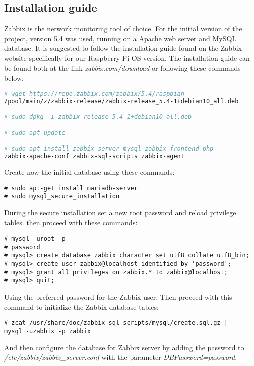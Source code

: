 \documentclass[a4paper,11pt]{scrartcl}
\begin{document}
\subsection{Installation guide}
Zabbix is the network monitoring tool of choice. For the initial version of the project, version 5.4 was used, running on a Apache web server and MySQL database. It is suggested to follow the installation guide found on the Zabbix website specifically for our Raspberry Pi OS version. The installation guide can be found both at the link \textit{zabbix.com/download} or following these commands below:\\
\begin{lstlisting}[language = bash]
# wget https://repo.zabbix.com/zabbix/5.4/raspbian
/pool/main/z/zabbix-release/zabbix-release_5.4-1+debian10_all.deb

# sudo dpkg -i zabbix-release_5.4-1+debian10_all.deb

# sudo apt update

# sudo apt install zabbix-server-mysql zabbix-frontend-php 
zabbix-apache-conf zabbix-sql-scripts zabbix-agent
\end{lstlisting}

Create now the initial database using these commands:
\begin{lstlisting}
# sudo apt-get install mariadb-server
# sudo mysql_secure_installation
\end{lstlisting}
During the secure installation set a new root password and reload privilege tables. then proceed with these commands:
\begin{lstlisting}
# mysql -uroot -p
# password
# mysql> create database zabbix character set utf8 collate utf8_bin;
# mysql> create user zabbix@localhost identified by 'password';
# mysql> grant all privileges on zabbix.* to zabbix@localhost;
# mysql> quit;
\end{lstlisting}
Using the preferred password for the Zabbix user.
Then proceed with this command to initialize the Zabbix database tables:

\begin{lstlisting}
# zcat /usr/share/doc/zabbix-sql-scripts/mysql/create.sql.gz | 
mysql -uzabbix -p zabbix
\end{lstlisting}

And then configure the database for Zabbix server by adding the password to \textit{/etc/zabbix/zabbix\_server.conf} with the parameter \textit{DBPassword=password}.
\end{document}
